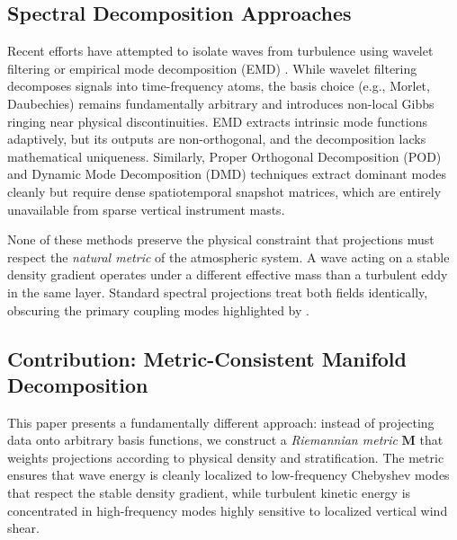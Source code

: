 \subsection{Spectral Decomposition Approaches}

Recent efforts have attempted to isolate waves from turbulence using wavelet filtering \citep{Vosper2006, Sun2015} or empirical mode decomposition (EMD) \citep{Huang1998}. While wavelet filtering decomposes signals into time-frequency atoms, the basis choice (e.g., Morlet, Daubechies) remains fundamentally arbitrary and introduces non-local Gibbs ringing near physical discontinuities. EMD extracts intrinsic mode functions adaptively, but its outputs are non-orthogonal, and the decomposition lacks mathematical uniqueness. Similarly, Proper Orthogonal Decomposition (POD) and Dynamic Mode Decomposition (DMD) techniques \citep{Schmid2010} extract dominant modes cleanly but require dense spatiotemporal snapshot matrices, which are entirely unavailable from sparse vertical instrument masts.

None of these methods preserve the physical constraint that projections must respect the \emph{natural metric} of the atmospheric system. A wave acting on a stable density gradient operates under a different effective mass than a turbulent eddy in the same layer. Standard spectral projections treat both fields identically, obscuring the primary coupling modes highlighted by \citet{Sun2015}.

\subsection{Contribution: Metric-Consistent Manifold Decomposition}

This paper presents a fundamentally different approach: instead of projecting data onto arbitrary basis functions, we construct a \emph{Riemannian metric} $\mathbf{M}$ that weights projections according to physical density and stratification. The metric ensures that wave energy is cleanly localized to low-frequency Chebyshev modes that respect the stable density gradient, while turbulent kinetic energy is concentrated in high-frequency modes highly sensitive to localized vertical wind shear. 

